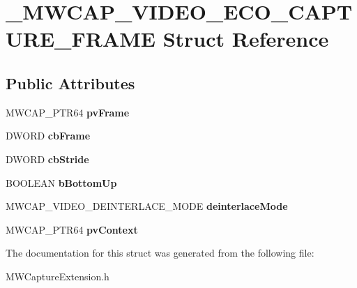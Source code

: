 \hypertarget{struct__MWCAP__VIDEO__ECO__CAPTURE__FRAME}{\section{\-\_\-\-M\-W\-C\-A\-P\-\_\-\-V\-I\-D\-E\-O\-\_\-\-E\-C\-O\-\_\-\-C\-A\-P\-T\-U\-R\-E\-\_\-\-F\-R\-A\-M\-E Struct Reference}
\label{struct__MWCAP__VIDEO__ECO__CAPTURE__FRAME}
}
\subsection*{Public Attributes}
\begin{DoxyCompactItemize}
\item 
\hypertarget{struct__MWCAP__VIDEO__ECO__CAPTURE__FRAME_a1692770be10e50adf839a2735e9a9278}{M\-W\-C\-A\-P\-\_\-\-P\-T\-R64 {\bfseries pv\-Frame}}\label{struct__MWCAP__VIDEO__ECO__CAPTURE__FRAME_a1692770be10e50adf839a2735e9a9278}

\item 
\hypertarget{struct__MWCAP__VIDEO__ECO__CAPTURE__FRAME_a05181a85749be39f6635c46091fd8a1c}{D\-W\-O\-R\-D {\bfseries cb\-Frame}}\label{struct__MWCAP__VIDEO__ECO__CAPTURE__FRAME_a05181a85749be39f6635c46091fd8a1c}

\item 
\hypertarget{struct__MWCAP__VIDEO__ECO__CAPTURE__FRAME_af4810d45372082ce0e086f1c101b6b83}{D\-W\-O\-R\-D {\bfseries cb\-Stride}}\label{struct__MWCAP__VIDEO__ECO__CAPTURE__FRAME_af4810d45372082ce0e086f1c101b6b83}

\item 
\hypertarget{struct__MWCAP__VIDEO__ECO__CAPTURE__FRAME_af1a2a6f8bcd6199de2980df0ded85d9d}{B\-O\-O\-L\-E\-A\-N {\bfseries b\-Bottom\-Up}}\label{struct__MWCAP__VIDEO__ECO__CAPTURE__FRAME_af1a2a6f8bcd6199de2980df0ded85d9d}

\item 
\hypertarget{struct__MWCAP__VIDEO__ECO__CAPTURE__FRAME_a6838aa2b71ebb8f0871bc3042ae68ea5}{M\-W\-C\-A\-P\-\_\-\-V\-I\-D\-E\-O\-\_\-\-D\-E\-I\-N\-T\-E\-R\-L\-A\-C\-E\-\_\-\-M\-O\-D\-E {\bfseries deinterlace\-Mode}}\label{struct__MWCAP__VIDEO__ECO__CAPTURE__FRAME_a6838aa2b71ebb8f0871bc3042ae68ea5}

\item 
\hypertarget{struct__MWCAP__VIDEO__ECO__CAPTURE__FRAME_a650fb7972a81eb651a267a062fe7ccde}{M\-W\-C\-A\-P\-\_\-\-P\-T\-R64 {\bfseries pv\-Context}}\label{struct__MWCAP__VIDEO__ECO__CAPTURE__FRAME_a650fb7972a81eb651a267a062fe7ccde}

\end{DoxyCompactItemize}


The documentation for this struct was generated from the following file\-:\begin{DoxyCompactItemize}
\item 
M\-W\-Capture\-Extension.\-h\end{DoxyCompactItemize}
